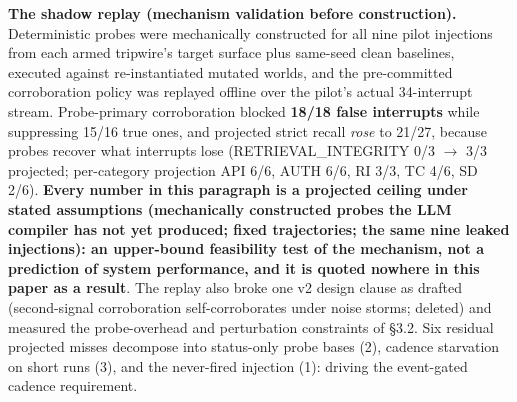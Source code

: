 \documentclass[acmsmall,screen,review,anonymous]{acmart}
\begin{document}
\textbf{The shadow replay (mechanism validation before construction).} Deterministic probes were mechanically constructed for all nine pilot injections from each armed tripwire's target surface plus same-seed clean baselines, executed against re-instantiated mutated worlds, and the pre-committed corroboration policy was replayed offline over the pilot's actual 34-interrupt stream. Probe-primary corroboration blocked \textbf{18/18 false interrupts} while suppressing 15/16 true ones, and projected strict recall \emph{rose} to 21/27, because probes recover what interrupts lose (RETRIEVAL\_INTEGRITY 0/3 $\rightarrow$ 3/3 projected; per-category projection API 6/6, AUTH 6/6, RI 3/3, TC 4/6, SD 2/6). \textbf{Every number in this paragraph is a projected ceiling under stated assumptions (mechanically constructed probes the LLM compiler has not yet produced; fixed trajectories; the same nine leaked injections): an upper-bound feasibility test of the mechanism, not a prediction of system performance, and it is quoted nowhere in this paper as a result}. The replay also broke one v2 design clause as drafted (second-signal corroboration self-corroborates under noise storms; deleted) and measured the probe-overhead and perturbation constraints of \S3.2. Six residual projected misses decompose into status-only probe bases (2), cadence starvation on short runs (3), and the never-fired injection (1): driving the event-gated cadence requirement.
\end{document}
